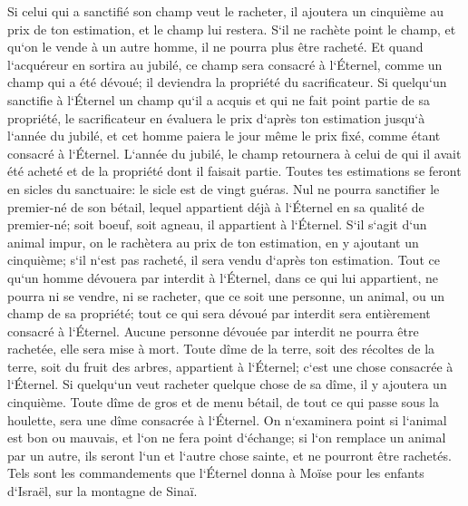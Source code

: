\verse Si celui qui a sanctifié son champ veut le racheter, il ajoutera un cinquième au prix de ton estimation, et le champ lui restera. 
\verse S`il ne rachète point le champ, et qu`on le vende à un autre homme, il ne pourra plus être racheté. 
\verse Et quand l`acquéreur en sortira au jubilé, ce champ sera consacré à l`Éternel, comme un champ qui a été dévoué; il deviendra la propriété du sacrificateur. 
\verse Si quelqu`un sanctifie à l`Éternel un champ qu`il a acquis et qui ne fait point partie de sa propriété, 
\verse le sacrificateur en évaluera le prix d`après ton estimation jusqu`à l`année du jubilé, et cet homme paiera le jour même le prix fixé, comme étant consacré à l`Éternel. 
\verse L`année du jubilé, le champ retournera à celui de qui il avait été acheté et de la propriété dont il faisait partie. 
\verse Toutes tes estimations se feront en sicles du sanctuaire: le sicle est de vingt guéras. 
\verse Nul ne pourra sanctifier le premier-né de son bétail, lequel appartient déjà à l`Éternel en sa qualité de premier-né; soit boeuf, soit agneau, il appartient à l`Éternel. 
\verse S`il s`agit d`un animal impur, on le rachètera au prix de ton estimation, en y ajoutant un cinquième; s`il n`est pas racheté, il sera vendu d`après ton estimation. 
\verse Tout ce qu`un homme dévouera par interdit à l`Éternel, dans ce qui lui appartient, ne pourra ni se vendre, ni se racheter, que ce soit une personne, un animal, ou un champ de sa propriété; tout ce qui sera dévoué par interdit sera entièrement consacré à l`Éternel. 
\verse Aucune personne dévouée par interdit ne pourra être rachetée, elle sera mise à mort. 
\verse Toute dîme de la terre, soit des récoltes de la terre, soit du fruit des arbres, appartient à l`Éternel; c`est une chose consacrée à l`Éternel. 
\verse Si quelqu`un veut racheter quelque chose de sa dîme, il y ajoutera un cinquième. 
\verse Toute dîme de gros et de menu bétail, de tout ce qui passe sous la houlette, sera une dîme consacrée à l`Éternel. 
\verse On n`examinera point si l`animal est bon ou mauvais, et l`on ne fera point d`échange; si l`on remplace un animal par un autre, ils seront l`un et l`autre chose sainte, et ne pourront être rachetés. 
\verse Tels sont les commandements que l`Éternel donna à Moïse pour les enfants d`Israël, sur la montagne de Sinaï. 
